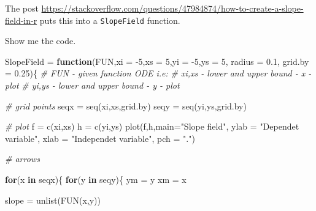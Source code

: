 \documentclass[
]{book}
\newenvironment{Shaded}{\begin{snugshade}}{\end{snugshade}}
\newcommand{\AttributeTok}[1]{\textcolor[rgb]{0.77,0.63,0.00}{#1}}
\newcommand{\CommentTok}[1]{\textcolor[rgb]{0.56,0.35,0.01}{\textit{#1}}}
\newcommand{\ControlFlowTok}[1]{\textcolor[rgb]{0.13,0.29,0.53}{\textbf{#1}}}
\newcommand{\DecValTok}[1]{\textcolor[rgb]{0.00,0.00,0.81}{#1}}
\newcommand{\FloatTok}[1]{\textcolor[rgb]{0.00,0.00,0.81}{#1}}
\newcommand{\FunctionTok}[1]{\textcolor[rgb]{0.00,0.00,0.00}{#1}}
\newcommand{\NormalTok}[1]{#1}
\newcommand{\OtherTok}[1]{\textcolor[rgb]{0.56,0.35,0.01}{#1}}
\newcommand{\SpecialCharTok}[1]{\textcolor[rgb]{0.00,0.00,0.00}{#1}}
\newcommand{\StringTok}[1]{\textcolor[rgb]{0.31,0.60,0.02}{#1}}
\begin{document}
The post \url{https://stackoverflow.com/questions/47984874/how-to-create-a-slope-field-in-r} puts this into a \texttt{SlopeField} function.

Show me the code.

\begin{Shaded}
\begin{Highlighting}[]
\NormalTok{SlopeField }\OtherTok{=} \ControlFlowTok{function}\NormalTok{(FUN,}\AttributeTok{xi =} \SpecialCharTok{{-}}\DecValTok{5}\NormalTok{,}\AttributeTok{xs =} \DecValTok{5}\NormalTok{,}\AttributeTok{yi =} \SpecialCharTok{{-}}\DecValTok{5}\NormalTok{,}\AttributeTok{ys =} \DecValTok{5}\NormalTok{, }\AttributeTok{radius =} \FloatTok{0.1}\NormalTok{, }\AttributeTok{grid.by =} \FloatTok{0.25}\NormalTok{)\{}
  \CommentTok{\# FUN   {-} given function ODE i.e:  }
  \CommentTok{\# xi,xs {-} lower and upper bound {-} x {-} plot}
  \CommentTok{\# yi,ys {-} lower and upper bound {-} y {-} plot}
  
  \CommentTok{\# grid points}
\NormalTok{  seqx }\OtherTok{=} \FunctionTok{seq}\NormalTok{(xi,xs,grid.by)}
\NormalTok{  seqy }\OtherTok{=} \FunctionTok{seq}\NormalTok{(yi,ys,grid.by)}
  
  \CommentTok{\# plot}
\NormalTok{  f }\OtherTok{=} \FunctionTok{c}\NormalTok{(xi,xs) }
\NormalTok{  h }\OtherTok{=} \FunctionTok{c}\NormalTok{(yi,ys)}
  \FunctionTok{plot}\NormalTok{(f,h,}\AttributeTok{main=}\StringTok{"Slope field"}\NormalTok{, }\AttributeTok{ylab =} \StringTok{"Dependet variable"}\NormalTok{, }\AttributeTok{xlab =} \StringTok{"Independet variable"}\NormalTok{, }\AttributeTok{pch =} \StringTok{"."}\NormalTok{)}
  
  \CommentTok{\# arrows}
  
  \ControlFlowTok{for}\NormalTok{(x }\ControlFlowTok{in}\NormalTok{ seqx)\{}
    \ControlFlowTok{for}\NormalTok{(y }\ControlFlowTok{in}\NormalTok{ seqy)\{}
\NormalTok{      ym }\OtherTok{=}\NormalTok{ y}
\NormalTok{      xm }\OtherTok{=}\NormalTok{ x}
      
\NormalTok{      slope }\OtherTok{=} \FunctionTok{unlist}\NormalTok{(}\FunctionTok{FUN}\NormalTok{(x,y))}
      

\end{Highlighting}
\end{Shaded}
\end{document}
